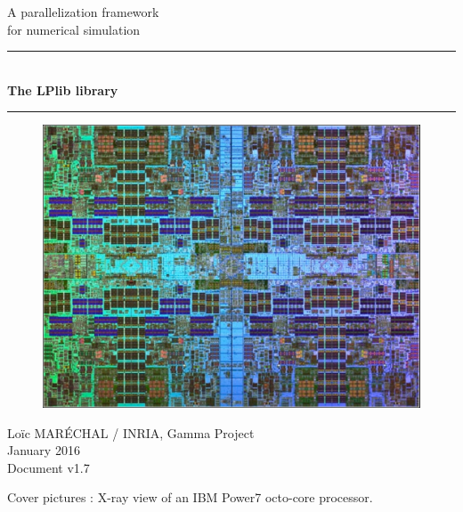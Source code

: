 \documentclass[a4paper,12pt]{article}
\newcommand{\HRule}{\rule{\linewidth}{1mm}}
\begin{document}
%
%

\begin{titlepage}

\begin{center}
\huge A parallelization framework\\ for numerical simulation
\HRule \\
\medskip
{\Huge \bfseries The LPlib library} \\
\HRule
\end{center}


\begin{figure}[htbp]
\begin{center}
\includegraphics[width=12cm]{power7.pdf}
\end{center}
\end{figure}


\begin{flushright}
\Large Lo\"ic MAR\'ECHAL / INRIA, Gamma Project\\
\Large January 2016 \\
\normalsize Document v1.7
\end{flushright}

\end{titlepage}

\clearpage

\setcounter{tocdepth}{2}
\tableofcontents
\vfill

\footnotesize{Cover pictures : X-ray view of an IBM Power7 octo-core processor.}
\normalsize
\end{document}
